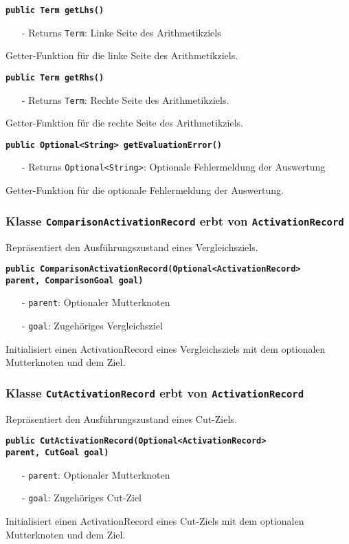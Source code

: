 \documentclass[parskip=full,11pt,twoside]{scrartcl}
\begin{document}
\textbf{\texttt{public Term getLhs()}}
\begin{itemize}[noitemsep]
	\item[-] Returns \texttt{Term}: Linke Seite des Arithmetikziels
\end{itemize}
Getter-Funktion für die linke Seite des Arithmetikziels.

\textbf{\texttt{public Term getRhs()}}
\begin{itemize}[noitemsep]
	\item[-] Returns \texttt{Term}: Rechte Seite des Arithmetikziels.
\end{itemize}
Getter-Funktion für die rechte Seite des Arithmetikziels.

\textbf{\texttt{public Optional<String> getEvaluationError()}}
\begin{itemize}[noitemsep]
	\item[-] Returns \texttt{Optional<String>}: Optionale Fehlermeldung der Auswertung
\end{itemize}
Getter-Funktion für die optionale Fehlermeldung der Auswertung.

\subsubsection{Klasse \texttt{ComparisonActivationRecord} erbt von \texttt{ActivationRecord}}
Repräsentiert den Ausführungszustand eines Vergleichsziels.

\textbf{\texttt{public ComparisonActivationRecord(Optional<ActivationRecord>\\ parent, ComparisonGoal goal)}}
\begin{itemize}[noitemsep]
	\item[-] \texttt{parent}: Optionaler Mutterknoten
	\item[-] \texttt{goal}: Zugehöriges Vergleichsziel
\end{itemize}
Initialisiert einen ActivationRecord eines Vergleichsziels mit dem optionalen Mutterknoten und dem Ziel.

\subsubsection{Klasse \texttt{CutActivationRecord} erbt von \texttt{ActivationRecord}}
Repräsentiert den Ausführungszustand eines Cut-Ziels.

\textbf{\texttt{public CutActivationRecord(Optional<ActivationRecord>\\ parent, CutGoal goal)}}
\begin{itemize}[noitemsep]
	\item[-] \texttt{parent}: Optionaler Mutterknoten
	\item[-] \texttt{goal}: Zugehöriges Cut-Ziel
\end{itemize}
Initialisiert einen ActivationRecord eines Cut-Ziels mit dem optionalen Mutterknoten und dem Ziel.
\end{document}
